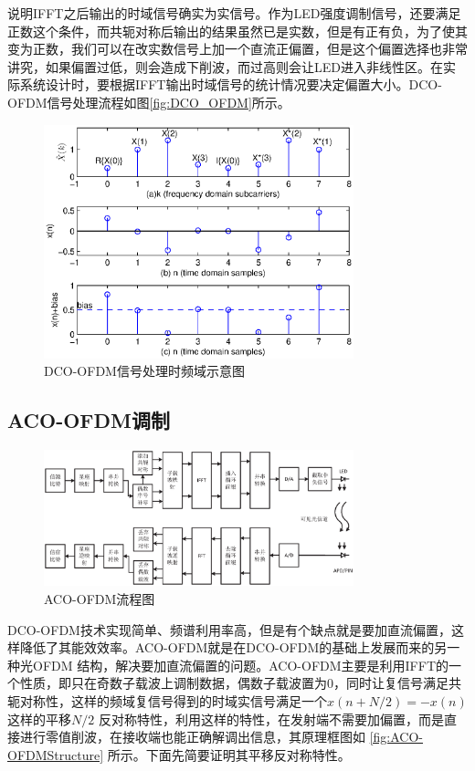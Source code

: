 说明IFFT之后输出的时域信号确实为实信号。作为LED强度调制信号，还要满足正数这个条件，而共轭对称后输出的结果虽然已是实数，但是有正有负，为了使其变为正数，我们可以在改实数信号上加一个直流正偏置，但是这个偏置选择也非常讲究，如果偏置过低，则会造成下削波，而过高则会让LED进入非线性区。在实际系统设计时，要根据IFFT输出时域信号的统计情况要决定偏置大小。DCO-OFDM信号处理流程如图\autoref{fig:DCO_OFDM}所示。
\begin{figure}[htbp]
    \centering
    \includegraphics[width=0.8\textwidth]{figures/chapter-2/DCO_OFDM.eps}
    \caption{DCO-OFDM信号处理时频域示意图}
    \label{fig:DCO_OFDM}
\end{figure}

\subsection{ACO-OFDM调制}

\begin{figure}[h]
    \centering
    \includegraphics[width=0.8\textwidth]{figures/chapter-2/ACO-OFDMStructure.eps}
    \caption{ACO-OFDM流程图}
    \label{fig:ACO-OFDMStructure}
\end{figure}
DCO-OFDM技术实现简单、频谱利用率高，但是有个缺点就是要加直流偏置，这样降低了其能效效率。ACO-OFDM就是在DCO-OFDM的基础上发展而来的另一种光OFDM 结构，解决要加直流偏置的问题。ACO-OFDM主要是利用IFFT的一个性质，即只在奇数子载波上调制数据，偶数子载波置为0，同时让复信号满足共轭对称性，这样的频域复信号得到的时域实信号满足一个$x(n+N/2)=-x(n)$这样的平移$N/2$ 反对称特性，利用这样的特性，在发射端不需要加偏置，而是直接进行零值削波，在接收端也能正确解调出信息，其原理框图如
\autoref{fig:ACO-OFDMStructure} 所示。下面先简要证明其平移反对称特性。

